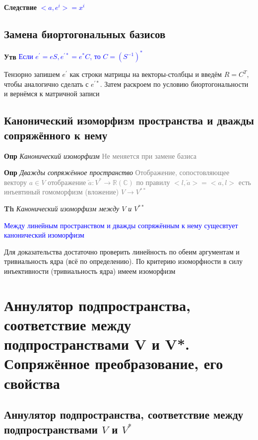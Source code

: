 \documentclass[a4paper, 14pt]{article}
\begin{document}
    \textbf{Следствие} \textcolor{blue}{$<a, e^i> = x^i$}

    \subsection{Замена биортогональных базисов}

    \textbf{Утв} \textcolor{blue}{Если $e^{'} = eS, e^{'*} = e^* C$, то $C = (S^{-1})^*$}

    Тензорно запишем $e^{'}$ как строки матрицы на векторы-столбцы и введём $R = C^T$, чтобы аналогично сделать с $e^{'*}$.
    Затем раскроем по условию биортогональности и вернёмся к матричной записи

    \subsection{Канонический изоморфизм пространства и дважды сопряжённого к нему}

    \textbf{Опр} \textit{Канонический изоморфизм} \textcolor{gray}{Не меняется при замене базиса}

    \textbf{Опр} \textit{Дважды сопряжённое пространство} \textcolor{gray}{Отображение, сопостовляющее
    вектору $a \in V$ отображение $\overleftarrow{a}: V^* \rightarrow \mathbb{R} (\mathbb{C})$ по
    правилу $<l, \overleftarrow{a}> = \overline{<a, l>}$ есть инъевтиный гомоморфизм (вложение) $V \rightarrow V^{**}$}

    \textbf{Th} \textit{Канонический изоморфизм между $V$ и $V^{**}$}

    \textcolor{blue}{Между линейным пространством и дважды сопряжённым к нему сущесвтует канонический изоморфизм}

    Для доказательства достаточно проверить линейность по обеим аргументам и тривиальность ядра (всё по
    определению).
    По критерию изоморфности в силу инъективности (тривиальность ядра) имеем изоморфизм

    \section{Аннулятор подпространства, соответствие между подпространствами V и V*.
    Сопряжённое преобразование, его свойства}

    \subsection{Аннулятор подпространства, соответствие между подпространствами $V$ и $V^*$}
\end{document}

